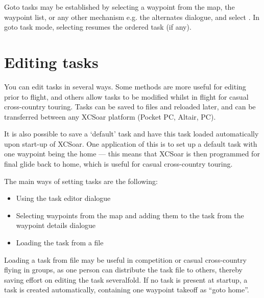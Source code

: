 Goto tasks may be established by selecting a waypoint from the map,
the waypoint list, or any other mechanism e.g. the alternates dialogue,
and select . In goto task mode, selecting
\blink{} resumes the ordered task (if
any).

\section{Editing tasks}

You can edit tasks in several ways.  Some methods are more useful for
editing prior to flight, and others allow tasks to be modified whilst
in flight for casual cross-country touring.  Tasks can be saved to
files and reloaded later, and can be transferred between any XCSoar
platform (Pocket PC, Altair, PC).

\tip It is also possible to save a `default' task and have this task loaded
automatically upon start-up of XCSoar.  One application of this is to
set up a default task with one waypoint being the home --- this means
that XCSoar is then programmed for final glide back to home, which is
useful for casual cross-country touring.

The main ways of setting tasks are the following:
\begin{itemize}
\item Using the task editor dialogue
\item Selecting waypoints from the map and adding them to the task from the
 waypoint details dialogue
\item Loading the task from a file
\end{itemize}

%

Loading a task from file may be useful in competition or casual
cross-country flying in groups, as one person can distribute the task
file to others, thereby saving effort on editing the task severalfold.
\tip
If no task is present at startup, a task is created automatically,
containing one waypoint takeoff as ``goto home''.

